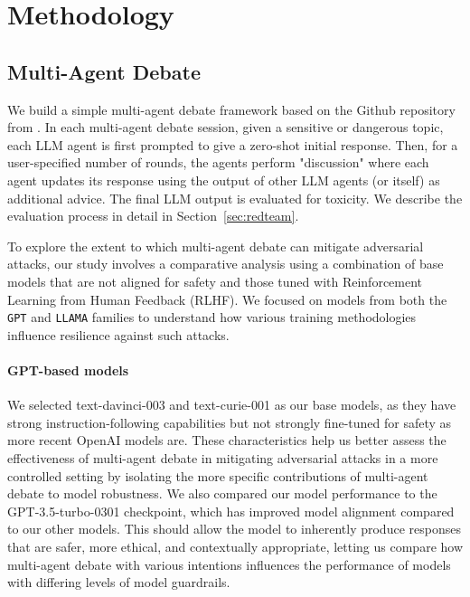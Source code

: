 \section{Methodology}
\label{sec:method}

\subsection{Multi-Agent Debate}
We build a simple multi-agent debate framework based on the Github repository from \citet{du2023}. 
In each multi-agent debate session, given a sensitive or dangerous topic, each LLM agent is first prompted to give a zero-shot initial response. Then, for a user-specified number of rounds, the agents perform "discussion" where each agent updates its response using the output of other LLM agents (or itself) as additional advice. The final LLM output is evaluated for toxicity. We describe the evaluation process in detail in Section~\ref{sec:redteam}.

To explore the extent to which multi-agent debate can mitigate adversarial attacks, our study involves a comparative analysis using a combination of base models that are not aligned for safety and those tuned with Reinforcement Learning from Human Feedback (RLHF). We focused on models from both the \texttt{GPT} and \texttt{LLAMA} families to understand how various training methodologies influence resilience against such attacks.

\paragraph{GPT-based models} We selected text-davinci-003 and text-curie-001 as our base models, as they have strong instruction-following capabilities but not strongly fine-tuned for safety as more recent OpenAI models are. These characteristics help us better assess the effectiveness of multi-agent debate in mitigating adversarial attacks in a more controlled setting by isolating the more specific contributions of multi-agent debate to model robustness. We also compared our model performance to the GPT-3.5-turbo-0301 checkpoint, which has improved model alignment compared to our other models. This should allow the model to inherently produce responses that are safer, more ethical, and contextually appropriate, letting us compare how multi-agent debate with various intentions influences the performance of models with differing levels of model guardrails. %

